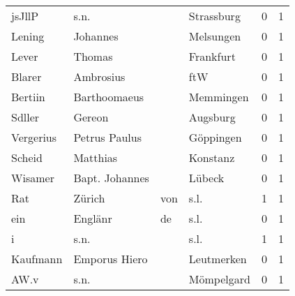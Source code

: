 \begin{center}
\begin{tiny}
\begin{longtabu}{llllrr}
                   jsJllP &                               s.n. &             &                                  Strassburg &          0 &         1 \\
                   Lening &                           Johannes &             &                                   Melsungen &          0 &         1 \\
                    Lever &                             Thomas &             &                                   Frankfurt &          0 &         1 \\
                   Blarer &                          Ambrosius &             &                                         ftW &          0 &         1 \\
                  Bertiin &                       Barthoomaeus &             &                                   Memmingen &          0 &         1 \\
                   Sdller &                             Gereon &             &                                    Augsburg &          0 &         1 \\
                Vergerius &                      Petrus Paulus &             &                                   Göppingen &          0 &         1 \\
                   Scheid &                           Matthias &             &                                    Konstanz &          0 &         1 \\
                  Wisamer &                     Bapt. Johannes &             &                                      Lübeck &          0 &         1 \\
                      Rat &                             Zürich &         von &                                        s.l. &          1 &         1 \\
                      ein &                            Englänr &          de &                                        s.l. &          0 &         1 \\
                        i &                               s.n. &             &                                        s.l. &          1 &         1 \\
                 Kaufmann &                      Emporus Hiero &             &                                  Leutmerken &          0 &         1 \\
                     AW.v &                               s.n. &             &                                  Mömpelgard &          0 &         1 \\

\end{longtabu}
\end{tiny}
\end{center}

